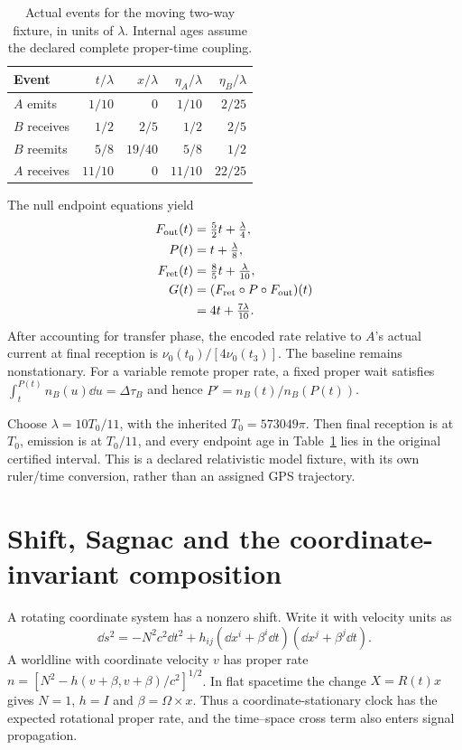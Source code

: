 \begin{table}[htbp]\centering\small
\caption{Actual events for the moving two-way fixture, in units of $\lambda$. Internal ages assume the declared complete proper-time coupling.}\label{tab:moving-events}
\begin{tabular}{@{}lrrrr@{}}\toprule
Event&$t/\lambda$&$x/\lambda$&$\eta_A/\lambda$&$\eta_B/\lambda$\\\midrule
$A$ emits&$1/10$&$0$&$1/10$&$2/25$\\
$B$ receives&$1/2$&$2/5$&$1/2$&$2/5$\\
$B$ reemits&$5/8$&$19/40$&$5/8$&$1/2$\\
$A$ receives&$11/10$&$0$&$11/10$&$22/25$\\\bottomrule
\end{tabular}\end{table}

The null endpoint equations yield
\[
 \begin{aligned}
 F_{\rm out}(t)&=\tfrac52t+\tfrac\lambda4,\\
 P(t)&=t+\tfrac\lambda8,\\
 F_{\rm ret}(t)&=\tfrac85t+\tfrac\lambda{10},\\
 G(t)&=(F_{\rm ret}\circ P\circ F_{\rm out})(t)\\
 &=4t+\tfrac{7\lambda}{10}.
 \end{aligned}
\]
After accounting for transfer phase, the encoded rate relative to $A$'s actual current at final reception is $\nu_0(t_0)/[4\nu_0(t_3)]$. The baseline remains nonstationary. For a variable remote proper rate, a fixed proper wait satisfies $\int_t^{P(t)}n_B(u)\dd u=\Delta\tau_B$ and hence $P'=n_B(t)/n_B(P(t))$.

Choose $\lambda=10T_0/11$, with the inherited $T_0=573049\pi$. Then final reception is at $T_0$, emission is at $T_0/11$, and every endpoint age in Table~\ref{tab:moving-events} lies in the original certified interval. This is a declared relativistic model fixture, with its own ruler/time conversion, rather than an assigned GPS trajectory.

\section{Shift, Sagnac and the coordinate-invariant composition}\label{sec:shift-sagnac}
A rotating coordinate system has a nonzero shift. Write it with velocity units as
\[
 \dd s^2=-N^2c^2\dd t^2+h_{ij}(\dd x^i+\beta^i\dd t)
                                  (\dd x^j+\beta^j\dd t).
\]
A worldline with coordinate velocity $v$ has proper rate $n=[N^2-h(v+\beta,v+\beta)/c^2]^{1/2}$. In flat spacetime the change $X=R(t)x$ gives $N=1$, $h=I$ and $\beta=\Omega\times x$. Thus a coordinate-stationary clock has the expected rotational proper rate, and the time--space cross term also enters signal propagation.

